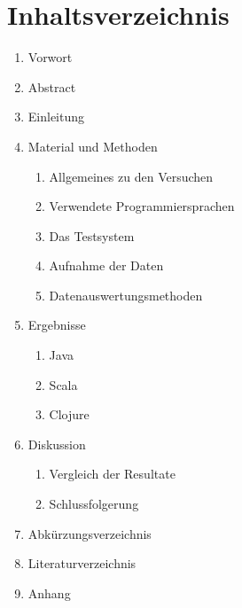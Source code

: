 \documentclass{fancydocument}
\begin{document}
\section*{Inhaltsverzeichnis}
\begin{enumerate}
	\item Vorwort  %
	\item Abstract %
	\item Einleitung  %
	\item Material und Methoden %
	\begin{enumerate}[4.1]
		\item Allgemeines zu den Versuchen  %
		\item Verwendete Programmiersprachen %
		\item Das Testsystem   %
		\item Aufnahme der Daten  %
		\item Datenauswertungsmethoden %
	\end{enumerate}
	\item Ergebnisse
	\begin{enumerate}[5.1]
		\item Java    %
		\item Scala   %
		\item Clojure %
	\end{enumerate}
	\item Diskussion
	\begin{enumerate}[6.1]
		\item Vergleich der Resultate %
		\item Schlussfolgerung %
	\end{enumerate}
	\item Abkürzungsverzeichnis
	\item Literaturverzeichnis
	\item Anhang	
\end{enumerate}

\end{document}
